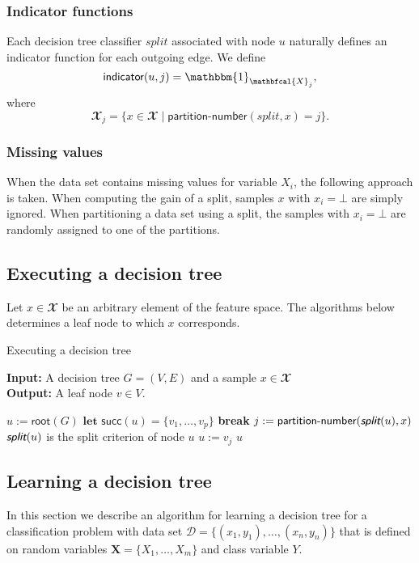 \documentclass{article}
\newcommand{\func}[1]{\ensuremath{\textsf{#1}}} %
\newcommand{\attr}[1]{\ensuremath{\fontfamily{cmss}\selectfont \textit{#1}}} %
\newcommand{\obj}[1]{\ensuremath{\textit{#1}}} %
\newcommand{\set}[1]{\ensuremath{\{ #1 \} }} %
\begin{document}
\subsubsection*{Indicator functions}
Each decision tree classifier \obj{split} associated with node $u$ naturally defines an indicator function for each outgoing edge. We define
\[
\func{indicator}(u, j) = \mathbbm{1}_{\mathbfcal{X}_j},
\]
where
\[
\mathbfcal{X}_j = \set{x \in \mathbfcal{X} \mid \func{partition-number}(\obj{split}, x) = j}.
\]

\subsubsection*{Missing values}
When the data set contains missing values for variable $X_i$, the following approach is taken. When computing the gain of a split, samples $x$ with $x_i = \bot$ are simply ignored. When partitioning a data set using a split, the samples with $x_i = \bot$ are randomly assigned to one of the partitions.

\subsection{Executing a decision tree}
Let $x \in \mathbfcal{X}$ be an arbitrary element of the feature space. The algorithms below determines a leaf node to which $x$ corresponds.

\begin{algorithm}[h]
\caption{Executing a decision tree}
{\textbf{Input:} A decision tree $G = (V,E)$ and a sample $x \in \mathbfcal{X}$} \\
{\textbf{Output:} A leaf node $v \in V$. }
\label{alg:execute_decision_tree}
\begin{algorithmic}[1]
\State $u := \func{root}(G)$
\State $\textbf{let } \func{succ}(u) = \set{v_1, \ldots, v_p}$
\While { \func{true} }
  \If { $\func{succ}(u) = \emptyset$ }
    \State \textbf{break}
  \EndIf
  \State $j := \func{partition-number}(\attr{split}(u), x)$ \Comment $\attr{split}(u)$ is the split criterion of node $u$
  \State $u := v_j$
\EndWhile
\State \Return $u$
\EndFunction
\end{algorithmic}
\end{algorithm}

\subsection{Learning a decision tree}
In this section we describe an algorithm for learning a decision tree for a classification problem with data set $\mathcal{D} = \{ (x_1, y_1), \ldots, (x_n, y_n) \}$ that is defined on random variables $\mathbf{X} = \{ X_1, \ldots, X_m \}$ and class variable $Y$. 
\end{document}
